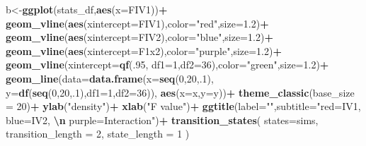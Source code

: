 \documentclass[
]{book}
\newenvironment{Shaded}{\begin{snugshade}}{\end{snugshade}}
\newcommand{\AttributeTok}[1]{\textcolor[rgb]{0.13,0.29,0.53}{#1}}
\newcommand{\DecValTok}[1]{\textcolor[rgb]{0.00,0.00,0.81}{#1}}
\newcommand{\FloatTok}[1]{\textcolor[rgb]{0.00,0.00,0.81}{#1}}
\newcommand{\FunctionTok}[1]{\textcolor[rgb]{0.13,0.29,0.53}{\textbf{#1}}}
\newcommand{\NormalTok}[1]{#1}
\newcommand{\OtherTok}[1]{\textcolor[rgb]{0.56,0.35,0.01}{#1}}
\newcommand{\SpecialCharTok}[1]{\textcolor[rgb]{0.81,0.36,0.00}{\textbf{#1}}}
\newcommand{\StringTok}[1]{\textcolor[rgb]{0.31,0.60,0.02}{#1}}
\begin{document}
\begin{Shaded}
\begin{Highlighting}[]
\NormalTok{b}\OtherTok{\textless{}{-}}\FunctionTok{ggplot}\NormalTok{(stats\_df,}\FunctionTok{aes}\NormalTok{(}\AttributeTok{x=}\NormalTok{FIV1))}\SpecialCharTok{+}
  \FunctionTok{geom\_vline}\NormalTok{(}\FunctionTok{aes}\NormalTok{(}\AttributeTok{xintercept=}\NormalTok{FIV1),}\AttributeTok{color=}\StringTok{"red"}\NormalTok{,}\AttributeTok{size=}\FloatTok{1.2}\NormalTok{)}\SpecialCharTok{+}
  \FunctionTok{geom\_vline}\NormalTok{(}\FunctionTok{aes}\NormalTok{(}\AttributeTok{xintercept=}\NormalTok{FIV2),}\AttributeTok{color=}\StringTok{"blue"}\NormalTok{,}\AttributeTok{size=}\FloatTok{1.2}\NormalTok{)}\SpecialCharTok{+}
  \FunctionTok{geom\_vline}\NormalTok{(}\FunctionTok{aes}\NormalTok{(}\AttributeTok{xintercept=}\NormalTok{F1x2),}\AttributeTok{color=}\StringTok{"purple"}\NormalTok{,}\AttributeTok{size=}\FloatTok{1.2}\NormalTok{)}\SpecialCharTok{+}
  \FunctionTok{geom\_vline}\NormalTok{(}\AttributeTok{xintercept=}\FunctionTok{qf}\NormalTok{(.}\DecValTok{95}\NormalTok{, }\AttributeTok{df1=}\DecValTok{1}\NormalTok{,}\AttributeTok{df2=}\DecValTok{36}\NormalTok{),}\AttributeTok{color=}\StringTok{"green"}\NormalTok{,}\AttributeTok{size=}\FloatTok{1.2}\NormalTok{)}\SpecialCharTok{+}
  \FunctionTok{geom\_line}\NormalTok{(}\AttributeTok{data=}\FunctionTok{data.frame}\NormalTok{(}\AttributeTok{x=}\FunctionTok{seq}\NormalTok{(}\DecValTok{0}\NormalTok{,}\DecValTok{20}\NormalTok{,.}\DecValTok{1}\NormalTok{),}
                            \AttributeTok{y=}\FunctionTok{df}\NormalTok{(}\FunctionTok{seq}\NormalTok{(}\DecValTok{0}\NormalTok{,}\DecValTok{20}\NormalTok{,.}\DecValTok{1}\NormalTok{),}\AttributeTok{df1=}\DecValTok{1}\NormalTok{,}\AttributeTok{df2=}\DecValTok{36}\NormalTok{)),}
            \FunctionTok{aes}\NormalTok{(}\AttributeTok{x=}\NormalTok{x,}\AttributeTok{y=}\NormalTok{y))}\SpecialCharTok{+}
  \FunctionTok{theme\_classic}\NormalTok{(}\AttributeTok{base\_size =} \DecValTok{20}\NormalTok{)}\SpecialCharTok{+}
  \FunctionTok{ylab}\NormalTok{(}\StringTok{"density"}\NormalTok{)}\SpecialCharTok{+}
  \FunctionTok{xlab}\NormalTok{(}\StringTok{"F value"}\NormalTok{)}\SpecialCharTok{+}
  \FunctionTok{ggtitle}\NormalTok{(}\AttributeTok{label=}\StringTok{""}\NormalTok{,}\AttributeTok{subtitle=}\StringTok{"red=IV1, blue=IV2, }\SpecialCharTok{\textbackslash{}n}\StringTok{ purple=Interaction"}\NormalTok{)}\SpecialCharTok{+}
  \FunctionTok{transition\_states}\NormalTok{(}
    \AttributeTok{states=}\NormalTok{sims,}
    \AttributeTok{transition\_length =} \DecValTok{2}\NormalTok{,}
    \AttributeTok{state\_length =} \DecValTok{1}
\NormalTok{  )}


\end{Highlighting}
\end{Shaded}
\end{document}
